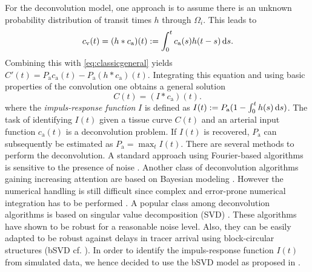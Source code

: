 \documentclass[journal,twocolumn]{IEEEtran}
\newcommand{\ca}{c_\mathrm{a}}
\newcommand{\cout}{c_{\mathrm{v}}}
\newcommand{\Pa}{P_{\mathrm{a}}}
\begin{document}
	For the deconvolution model, one approach is to assume there is an unknown probability distribution of transit times $h$ through $\Omega_i$. 
	This leads to
	\begin{equation}
		\cout(t) = (h*\ca)(t) := \int_0^t \ca(s) h(t-s) \diffint s.
	\end{equation}
	Combining this with \eqref{eq:classicgeneral} yields $C'(t) = \Pa\ca(t)-\Pa (h*\ca)(t)$.
	Integrating this equation and using basic properties of the convolution one obtains a general solution
	\begin{equation}
		C(t) = (I*\ca)(t).
		\label{eq:conv}
	\end{equation}
	where the \emph{impuls-response function} $I$ is defined as $I(t) := \Pa(1-\int_0^t h(s) \diffint s)$.
	The task of identifying $I(t)$ given a tissue curve $C(t)$ and an arterial input function $\ca(t)$ is a deconvolution problem.
	If $I(t)$ is recovered, $\Pa$ can subsequently be estimated as $\Pa = \max_{t} I(t)$.
	There are several methods to perform the deconvolution.
	A standard approach using Fourier-based algorithms is sensitive to the presence of noise \cite{ostergaard96}.
	Another class of deconvolution algorithms gaining increasing attention are based on Bayesian modeling \cite{boutelier12}.
	However the numerical handling is still difficult since complex and error-prone numerical integration has to be performed \cite{boutelier12}.
	A popular class among deconvolution algorithms is based on singular value decomposition (SVD) \cite{ostergaard96}.
	These algorithms have shown to be robust for a reasonable noise level.
	Also, they can be easily adapted to be robust against delays in tracer arrival using block-circular structures (bSVD cf. \cite{wu03}).
	In order to identify the impuls-response function $I(t)$ from simulated data, we hence decided to use the bSVD model as proposed in \cite{wu03}.

\end{document}
